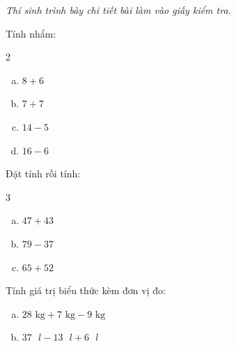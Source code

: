 {\itshape Thí sinh trình bày chi tiết bài làm vào giấy kiểm tra.}

\begin{bt}[1,0 điểm]
Tính nhẩm:
\begin{multicols}{2}
\begin{enumerate}[a)]
  \item $8 + 6$
  \item $7 + 7$
  \item $14 - 5$
  \item $16 - 6$
\end{enumerate}
\end{multicols}
\end{bt}

\begin{bt}[1,5 điểm]
Đặt tính rồi tính:
\begin{multicols}{3}
\begin{enumerate}[a)]
  \item $47 + 43$
  \item $79 - 37$
  \item $65 + 52$
\end{enumerate}
\end{multicols}
\end{bt}

\begin{bt}[1,0 điểm]
Tính giá trị biểu thức kèm đơn vị đo:
\begin{enumerate}[a)]
  \item $28\text{ kg} + 7\text{ kg} - 9\text{ kg}$
  \item $37\text{ }l - 13\text{ }l + 6\text{ }l$
\end{enumerate}
\end{bt}

